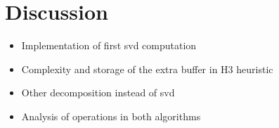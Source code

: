 \documentclass[runningheads]{llncs}
\begin{document}
\section{Discussion}
\label{sec:discussion}
\begin{itemize}
	\item Implementation of first svd computation
	\item Complexity and storage of the extra buffer in H3 heuristic
	\item Other decomposition instead of svd
	\item Analysis of operations in both algorithms
\end{itemize}

%
%
%
 
 
\end{document}

